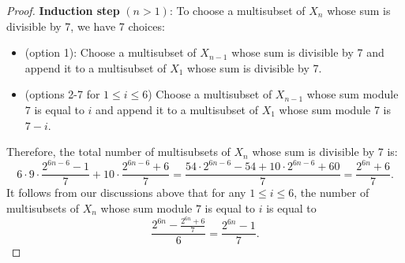 \begin{solution}
\begin{proof}
\noindent \textbf{Induction step} $(n>1)$: To choose a multisubset of $X_n$ whose sum is divisible by 7, we have 7 choices:
\begin{itemize}
	\item (option 1): Choose a multisubset of $X_{n-1}$ whose sum is divisible by 7  and append it to a multisubset of $X_1$ whose sum is divisible by 7.
	\item (options 2-7 for $1 \leq i \leq 6$) Choose a multisubset of $X_{n-1}$ whose sum module $7$ is equal to $i$ and append it to a multisubset of $X_1$ whose sum module 7 is $7-i$.
\end{itemize}
Therefore, the total number of multisubsets of $X_n$ whose sum is divisible by 7 is: $$6 \cdot 9 \cdot \frac{2^{6n-6} - 1}{7} + 10 \cdot \frac{2^{6n-6}+6}{7} = \frac{54 \cdot 2^{6n-6} - 54 + 10 \cdot 2^{6n-6} + 60}{7} = \frac{2^{6n} + 6}{7}.$$
It follows from our discussions above that for any $1 \leq i \leq 6$, the number of multisubsets of $X_n$ whose sum module $7$ is equal to $i$ is equal to $$\frac{2^{6n} - \frac{2^{6n}+6}{7}}{6} = \frac{2^{6n}-1}{7}.$$
\end{proof}
\end{solution}